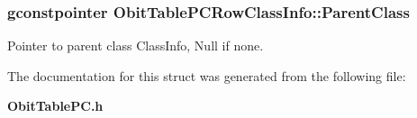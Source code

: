 \subsubsection{\setlength{\rightskip}{0pt plus 5cm}gconstpointer {\bf Obit\-Table\-PCRow\-Class\-Info::Parent\-Class}}\label{structObitTablePCRowClassInfo_o3}


Pointer to parent class Class\-Info, Null if none. 



The documentation for this struct was generated from the following file:\begin{CompactItemize}
\item 
{\bf Obit\-Table\-PC.h}\end{CompactItemize}
